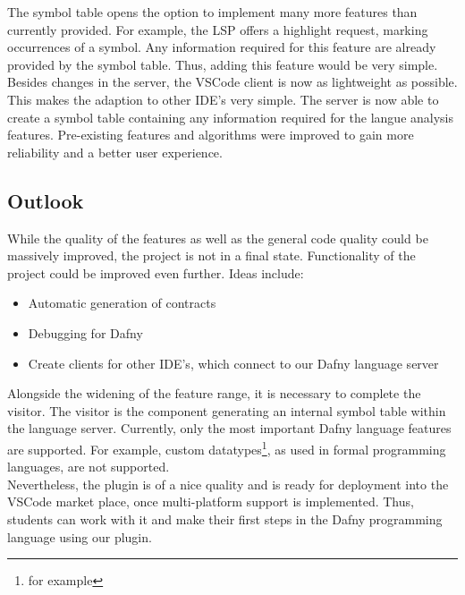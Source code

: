 The symbol table opens the option to implement many more features than currently provided.
For example, the LSP offers a highlight request, marking occurrences of a symbol.
Any information required for this feature are already provided by the symbol table.
Thus, adding this feature would be very simple.\\

Besides changes in the server, the VSCode client is now as lightweight as possible.
This makes the adaption to other IDE's very simple.
The server is now able to create a symbol table containing any information required for the langue analysis features.
Pre-existing features and algorithms were improved to gain more reliability and a better user experience.

\subsection{Outlook}
While the quality of the features as well as the general code quality could be massively improved, the project is not in a final state.
Functionality of the project could be improved even further.
Ideas include:
\begin{itemize}
    \item Automatic generation of contracts
    \item Debugging for Dafny
    \item Create clients for other IDE's, which connect to our Dafny language server
\end{itemize}

Alongside the widening of the feature range, it is necessary to complete the visitor.
The visitor is the component generating an internal symbol table within the language server.
Currently, only the most important Dafny language features are supported.
For example, custom datatypes\footnote{for example }, as used in formal programming languages, are not supported.\\

Nevertheless, the plugin is of a nice quality and is ready for deployment into the VSCode market place, once multi-platform support is implemented.
Thus, students can work with it and make their first steps in the Dafny programming language using our plugin.

